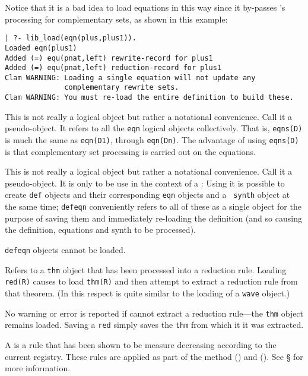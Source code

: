 \begin{description}
Notice that it is a bad idea to load equations in this way since it
by-passes \clam's processing for complementary sets, as shown in
this example:
\begin{verbatim}
| ?- lib_load(eqn(plus,plus1)).
Loaded eqn(plus1)
Added (=) equ(pnat,left) rewrite-record for plus1
Added (=) equ(pnat,left) reduction-record for plus1
Clam WARNING: Loading a single equation will not update any
              complementary rewrite sets.
Clam WARNING: You must re-load the entire definition to build these.
\end{verbatim}

\item[{\tt \inxtt{eqns}}:]
This is not really a logical
object but rather a notational convenience. Call it a pseudo-object.
It refers to all the {\tt eqn} logical objects collectively.  That is,
{\tt eqns(D)} is much the same as {\tt eqn(D1)}, through {\tt eqn(Dn)}.
The advantage of using {\tt eqns(D)} is that complementary set
processing is carried out on the equations.

\item[{\tt \inxtt{defeqn}}:]
This is not really a logical
object but rather a notational convenience. Call it a
pseudo-object. It is only to be use in the context of a
: Using  it is possible to create
{\tt def} objects and their corresponding {\tt eqn} objects and a {\tt
synth} object at the same time; {\tt defeqn} conveniently refers to
all of these as a single object for the purpose of saving them and
immediately re-loading the definition (and so causing the definition, equations and synth to be processed).

{\tt defeqn} objects cannot be loaded.

\item[{\tt \inxtt{red}}:]
Refers to a {\tt thm} object that has been processed into a reduction
rule.  Loading {\tt red(R)} causes \clam to load {\tt thm(R)} and then
attempt to extract a reduction rule from that theorem.  (In this
respect is quite similar to the loading of a {\tt wave} object.)

No warning or error is reported if \clam cannot extract a reduction
rule---the {\tt thm} object remains loaded.  Saving a {\tt red} simply
saves the {\tt thm} from which it it was extracted.

A  is a rule that has
been shown to be measure decreasing according to the current registry.
These rules are applied as part of the 
method () and
 ().  See \S{}
for more information.  


\end{description}
